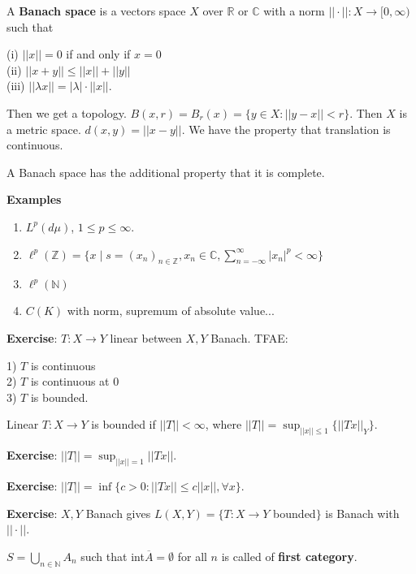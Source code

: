\documentclass[11pt]{article}
\newenvironment{defn}[1][Definition]{\begin{trivlist}
\item[\hskip \labelsep {\bfseries #1}]}{\end{trivlist}}
\newcommand{\ov}[1]{\overline{#1}}
\newcommand{\ra}{\rightarrow}
\newcommand{\es}{\emptyset}
\newcommand{\la}{\lambda}
\newcommand{\su}[2]{\sum_{#1}^{#2}}
\newcommand{\bcu}[2]{\bigcup_{#1}^{#2}}
\newcommand{\re}{\mathbb{R}}
\newcommand{\co}{\mathbb{C}}
\newcommand{\z}{\mathbb{Z}}
\newcommand{\na}{\mathbb N}
\begin{document}
A {\bf Banach space} is a vectors space $X$ over $\re$ or $\co$ with a norm $||\cdot||:X\ra[0,\infty)$ such that 

(i) $||x||=0$ if and only if $x=0$\\
(ii) $||x+y||\le ||x||+||y||$\\
(iii) $||\la x||=|\la|\cdot||x||$.

Then we get a topology. $B(x,r)=B_r(x)=\{y\in X: ||y-x||<r\}$. Then $X$ is a metric space. $d(x,y)=||x-y||$. We have the property that translation is continuous. 

A Banach space has the additional property that it is complete. 

{\bf Examples}
\begin{enumerate}
\item $L^p(d\mu)$, $1\le p\le \infty$. 

\item $\ell^p(\z)=\{x\mid s=(x_n)_{n\in\z}, x_n\in\co, \su{n=-\infty}{\infty}|x_n|^p<\infty\}$

\item $\ell^p(\na)$

\item $C(K)$ with norm, supremum of absolute value... 
\end{enumerate}

{\bf Exercise}: $T:X\ra Y$ linear between $X,Y$ Banach. TFAE:

1) $T$ is continuous\\
2) $T$ is continuous at 0\\
3) $T$ is bounded. 

\begin{defn}
Linear $T:X\ra Y$ is bounded if $||T||<\infty$, where $||T||=\sup_{||x||\le1}\{||Tx||_Y\}$. 
\end{defn}

{\bf Exercise}: $||T||=\sup_{||x||=1}||Tx||$. 

{\bf Exercise}: $||T||=\inf\{c>0: ||Tx||\le c||x||, \forall x\}$. 

{\bf Exercise}: $X,Y$ Banach gives $L(X,Y)=\{T:X\ra Y$ bounded$\}$ is Banach with $||\cdot||$. 

\begin{defn}
$S=\bcu{n\in\na}{}A_n$ such that int$\ov{A}=\es$ for all $n$ is called of {\bf first category}. 
\end{defn}
\end{document}
